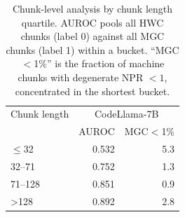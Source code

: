 \begin{table}[t]
\centering
\caption{Chunk-level analysis by chunk length quartile. AUROC pools all HWC chunks (label 0) against all MGC chunks (label 1) within a bucket. ``MGC$<$1\%'' is the fraction of machine chunks with degenerate NPR $<1$, concentrated in the shortest bucket.}
\label{tab:chunk-by-length}
\begin{tabular}{lrr}
\toprule
Chunk length & \multicolumn{2}{c}{CodeLlama-7B} \\
 & AUROC & MGC$<$1\% \\
\midrule
$\leq$32 & 0.532 & 5.3 \\
32--71 & 0.752 & 1.3 \\
71--128 & 0.851 & 0.9 \\
>128 & 0.892 & 2.8 \\
\bottomrule
\end{tabular}
\end{table}
